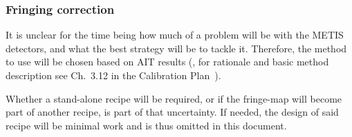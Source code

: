 
\label{rec:metisnadcmslitloss}
\label{rec:metis_n_adc_slitloss}

\subsubsection{Fringing correction}
\label{rec:metis_fringing_correction}

It is unclear for the time being how much of a problem will be with the METIS
detectors, and what the best strategy will be to tackle it. Therefore, the
method to use will be chosen based on AIT results (, for rationale and basic method description see Ch.~3.12 in the Calibration Plan~\cite{METIS-calibration_plan}).

Whether a stand-alone recipe will be required, or if the fringe-map will become
part of another recipe, is part of that uncertainty. If needed, the design of
said recipe will be minimal work and is thus omitted in this document.

